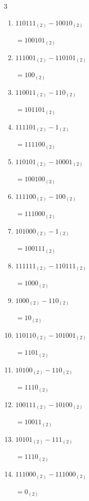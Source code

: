 \begin{multicols}{3}
\begin{enumerate}
  \item $110111_{(2)} - 10010_{(2)}$

        $=100101_{(2)}$

  \item $111001_{(2)} - 110101_{(2)}$

        $=100_{(2)}$

\columnbreak %

  \item $110011_{(2)} - 110_{(2)}$

        $=101101_{(2)}$

  \item $111101_{(2)} - 1_{(2)}$

        $=111100_{(2)}$

  \item $110101_{(2)} - 10001_{(2)}$

        $=100100_{(2)}$

  \item $111100_{(2)} - 100_{(2)}$

        $=111000_{(2)}$

  \item $101000_{(2)} - 1_{(2)}$

        $=100111_{(2)}$

  \item $111111_{(2)} - 110111_{(2)}$

        $=1000_{(2)}$

  \item $1000_{(2)} - 110_{(2)}$

        $=10_{(2)}$

  \item $110110_{(2)} - 101001_{(2)}$

        $=1101_{(2)}$

  \item $10100_{(2)} - 110_{(2)}$

        $=1110_{(2)}$

  \item $100111_{(2)} - 10100_{(2)}$

        $=10011_{(2)}$

\columnbreak %

  \item $10101_{(2)} - 111_{(2)}$

        $=1110_{(2)}$

  \item $111000_{(2)} - 111000_{(2)}$

        $=0_{(2)}$


\end{enumerate}
\end{multicols}
